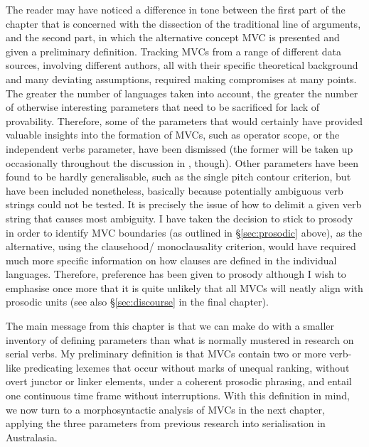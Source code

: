 The reader may have noticed a difference in tone between the first part of the chapter that is concerned with the dissection of the traditional line of arguments, and the second part, in which the alternative concept MVC is presented and given a preliminary definition. Tracking MVCs from a range of different data sources, involving different authors, all with their specific theoretical background and many deviating assumptions, required making compromises at many points. The greater the number of languages taken into account, the greater the number of otherwise interesting parameters that need to be sacrificed for lack of provability. Therefore, some of the parameters that would certainly have provided valuable insights into the formation of MVCs, such as operator scope, or the independent verbs parameter, have been dismissed (the former will be taken up occasionally throughout the discussion in , though). Other parameters have been found to be hardly generalisable, such as the single pitch contour criterion, but have been included nonetheless, basically because potentially ambiguous verb strings could not be tested. It is precisely the issue of how to delimit a given verb string that causes most ambiguity. I have taken the decision to stick to prosody in order to identify MVC boundaries (as outlined in §\ref{sec:prosodic} above), as the alternative, using the clausehood/ monoclausality criterion, would have required much more specific information on how clauses are defined in the individual languages. Therefore, preference has been given to prosody although I wish to emphasise once more that it is quite unlikely that all MVCs will neatly align with prosodic units (see also §\ref{sec:discourse} in the final chapter).

The main message from this chapter is that we can make do with a smaller inventory of defining parameters than what is normally mustered in research on serial verbs. My preliminary definition is that MVCs contain two or more verb-like predicating lexemes that occur without marks of unequal ranking, without overt junctor or linker elements, under a coherent prosodic phrasing, and entail one continuous time frame without interruptions. With this definition in mind, we now turn to a morphosyntactic analysis of MVCs in the next chapter, applying the three parameters from previous research into serialisation in Australasia. 
